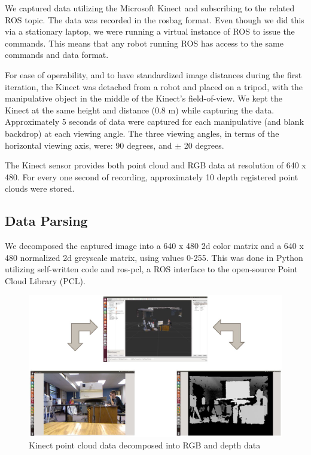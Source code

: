 \documentclass{article}
\begin{document}
We captured data utilizing the Microsoft Kinect and subscribing to the related ROS topic.  The data was recorded in the rosbag format.  Even though we did this via a stationary laptop, we were running a virtual instance of ROS to issue the commands. This means that any robot running ROS has access to the same commands and data format. 

For ease of operability, and to have standardized image distances during the first iteration, the Kinect  was detached from a robot and placed on a tripod, with the manipulative object in the middle of the Kinect's field-of-view. We kept the Kinect at the same height and distance (0.8 m) while capturing the data. Approximately 5 seconds of data were captured for each manipulative (and blank backdrop) at each viewing angle. The three viewing angles, in terms of the horizontal viewing axis, were: 90 degrees, and \(\pm\) 20 degrees.

The Kinect sensor provides both point cloud and RGB data at resolution of 640 x 480. For every one second of recording, approximately 10 depth registered point clouds were stored.

\subsection{Data Parsing}
We decomposed the captured image into a 640 x 480 2d color matrix and a 640 x 480 normalized 2d greyscale matrix, using values 0-255. This was done in Python utilizing self-written code and ros-pcl, a ROS interface to the open-source Point Cloud Library (PCL)\cite{pcl, rospcl}.

\begin{figure}
	\centering
	\includegraphics[width=1.0\textwidth]{RVIZ_Decomposition.JPG}
	\caption{Kinect point cloud data decomposed into RGB and depth data}
	\label{fig:RVIZ_decomp}
\end{figure}
\end{document}
